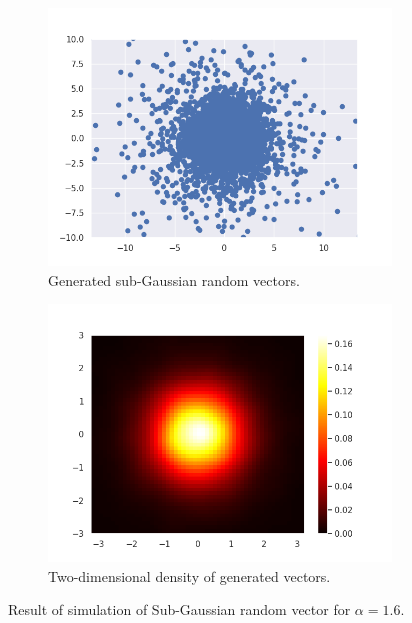 \documentclass{article}
\begin{document}
	\begin{figure}\label{dwa}
		\centering
		\begin{subfigure}[H]{0.49\textwidth}
			\centering
			\includegraphics[width=\textwidth]{images/ex_2_alpha_stable_vector_simulation_sub_gaussian_SaS_catter}
			\caption{Generated sub-Gaussian random vectors.}\label{4}
		\end{subfigure}
		\hfill
		\begin{subfigure}[H]{0.49\textwidth}
			\centering
			\includegraphics[width=\textwidth]{images/ex_2_alpha_stable_vector_simulation_sub_gaussian_SaS_heatmap}
			\caption{Two-dimensional density of generated vectors.}\label{5}
		\end{subfigure}
		\caption{Result of simulation of Sub-Gaussian random vector for $\alpha = 1.6$.}
	\end{figure}
	
\end{document}

